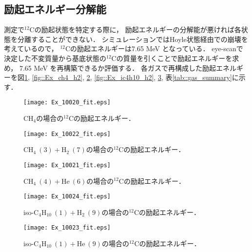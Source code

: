 \documentclass[../master]{subfiles}
\begin{document}
\subsection{励起エネルギー分解能}
測定で${}^{12}\mathrm{C}$の励起状態を特定する際に，
励起エネルギーの分解能が悪ければ各状態を分離することができない．
シミュレーションではHoyle状態経由での崩壊を考えているので，
${}^{12}\mathrm{C}$の励起エネルギーは7.65 MeV となっている．
eye-scanで決定した不変質量から基底状態の${}^{12}\mathrm{C}$の質量を引くことで励起エネルギーを求め，
7.65 MeV を再構築できるか評価する．
各ガスで再構成した励起エネルギーを図\ref{fig::Ex_ch4}, \ref{fig::Ex_ch4_h2}, \ref{fig::Ex_ch4_he},
\ref{fig::Ex_ic4h10_h2}, \ref{fig::Ex_ic4h10_he}, 表\ref{tab::gas_summary}に示す．
\begin{figure}
  \centering
  \begin{minipage}{0.45\columnwidth}
    \centering
    \texttt{[image: Ex\_10020\_fit.eps]}
    \caption{$\mathrm{CH}_{4}$の場合の${}^{12}\mathrm{C}$の励起エネルギー．}
    \label{fig::Ex_ch4}
  \end{minipage}
\end{figure}
\begin{figure}
  \centering
  \begin{minipage}{0.45\columnwidth}
    \centering
    \texttt{[image: Ex\_10022\_fit.eps]}
    \caption{$\mathrm{CH}_{4}\ (3) + \mathrm{H}_{2}\ (7)$の場合の${}^{12}\mathrm{C}$の励起エネルギー．}
    \label{fig::Ex_ch4_h2}
  \end{minipage}
  \begin{minipage}{0.45\columnwidth}
    \centering
    \texttt{[image: Ex\_10021\_fit.eps]}
    \caption{$\mathrm{CH}_{4}\ (4) + \mathrm{He}\ (6)$の場合の${}^{12}\mathrm{C}$の励起エネルギー．}
    \label{fig::Ex_ch4_he}
  \end{minipage}
\end{figure}
\begin{figure}
  \centering
  \begin{minipage}{0.45\columnwidth}
    \centering
    \texttt{[image: Ex\_10024\_fit.eps]}
    \caption{iso-$\mathrm{C}_{4}\mathrm{H}_{10}\ (1) + \mathrm{H}_{2}\ (9)$の場合の${}^{12}\mathrm{C}$の励起エネルギー．}
    \label{fig::Ex_ic4h10_h2}
  \end{minipage}
  \begin{minipage}{0.45\columnwidth}
    \centering
    \texttt{[image: Ex\_10023\_fit.eps]}
    \caption{iso-$\mathrm{C}_{4}\mathrm{H}_{10}\ (1) + \mathrm{He}\ (9)$の場合の${}^{12}\mathrm{C}$の励起エネルギー．}
    \label{fig::Ex_ic4h10_he}
  \end{minipage}
\end{figure}
\end{document}
